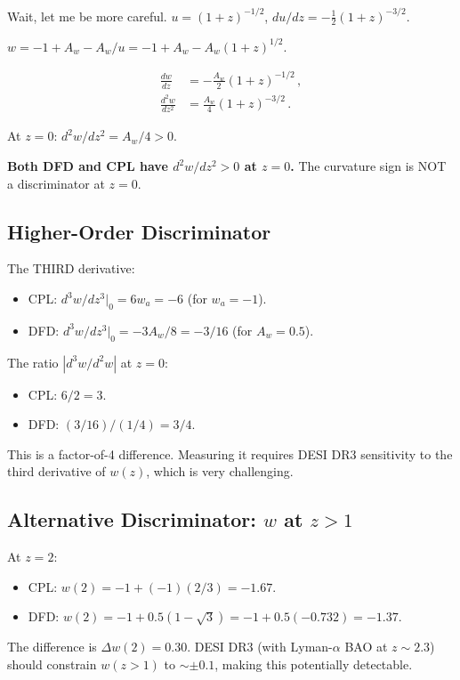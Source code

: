 \documentclass[11pt,a4paper]{article}
\begin{document}
Wait, let me be more careful. $u = (1+z)^{-1/2}$, $du/dz = -\frac{1}{2}(1+z)^{-3/2}$.

$w = -1 + A_w - A_w/u = -1 + A_w - A_w(1+z)^{1/2}$.

\begin{align}
\frac{dw}{dz} &= -\frac{A_w}{2}(1+z)^{-1/2}\,, \\
\frac{d^2w}{dz^2} &= \frac{A_w}{4}(1+z)^{-3/2}\,.
\end{align}

At $z = 0$: $d^2w/dz^2 = A_w/4 > 0$.

\textbf{Both DFD and CPL have $d^2w/dz^2 > 0$ at $z = 0$.} The curvature sign is NOT a discriminator at $z = 0$.

\subsection{Higher-Order Discriminator}

The THIRD derivative:
\begin{itemize}
\item CPL: $d^3w/dz^3|_0 = 6w_a = -6$ (for $w_a = -1$).
\item DFD: $d^3w/dz^3|_0 = -3A_w/8 = -3/16$ (for $A_w = 0.5$).
\end{itemize}

The ratio $|d^3w/d^2w|$ at $z = 0$:
\begin{itemize}
\item CPL: $6/2 = 3$.
\item DFD: $(3/16)/(1/4) = 3/4$.
\end{itemize}

This is a factor-of-4 difference. Measuring it requires DESI DR3 sensitivity to the third derivative of $w(z)$, which is very challenging.

\subsection{Alternative Discriminator: $w$ at $z > 1$}

At $z = 2$:
\begin{itemize}
\item CPL: $w(2) = -1 + (-1)(2/3) = -1.67$.
\item DFD: $w(2) = -1 + 0.5(1 - \sqrt{3}) = -1 + 0.5(-0.732) = -1.37$.
\end{itemize}

The difference is $\Delta w(2) = 0.30$. DESI DR3 (with Lyman-$\alpha$ BAO at $z \sim 2.3$) should constrain $w(z > 1)$ to $\sim \pm 0.1$, making this potentially detectable.
\end{document}

